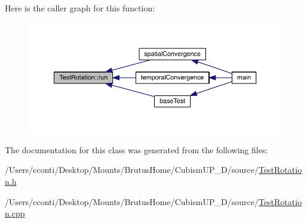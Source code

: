 Here is the caller graph for this function\+:
\nopagebreak
\begin{figure}[H]
\begin{center}
\leavevmode
\includegraphics[width=350pt]{d0/d20/class_test_rotation_a2b974c85b98b1361cd3640461eba7074_icgraph}
\end{center}
\end{figure}




The documentation for this class was generated from the following files\+:\begin{DoxyCompactItemize}
\item 
/\+Users/cconti/\+Desktop/\+Mounts/\+Brutus\+Home/\+Cubism\+U\+P\+\_\+D/source/\hyperlink{_test_rotation_8h}{Test\+Rotation.\+h}\item 
/\+Users/cconti/\+Desktop/\+Mounts/\+Brutus\+Home/\+Cubism\+U\+P\+\_\+D/source/\hyperlink{_test_rotation_8cpp}{Test\+Rotation.\+cpp}\end{DoxyCompactItemize}
